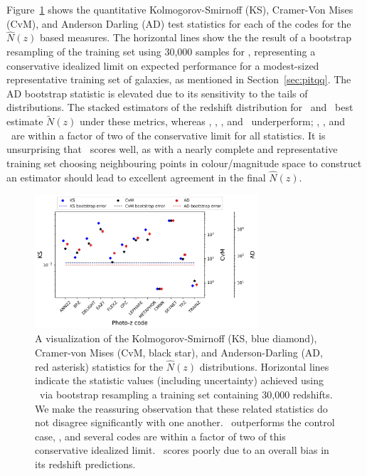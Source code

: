 Figure~\ref{fig:nz_stats} shows the quantitative Kolmogorov-Smirnoff (KS), Cramer-Von Mises (CvM), and Anderson Darling (AD) test statistics for each of the codes for the $\hat{N}(z)$ based measures.
The horizontal lines show the the result of a bootstrap resampling of the training set using 30,000 samples for \trainz, representing a conservative idealized limit on expected performance for a modest-sized representative training set of galaxies, as mentioned in Section~\ref{sec:pitqq}.
The AD bootstrap statistic is elevated due to its sensitivity to the tails of distributions.
The stacked estimators of the redshift distribution for \cmnn\ and \trainz\ best estimate $\tilde{N}(z)$ under these metrics, whereas \eazy, \lephare, \metaphor, and \skynet\ underperform; \bpz, \gpz, and \tpz\ are within a factor of two of the conservative limit for all statistics.
It is unsurprising that \cmnn\ scores well, as with a nearly complete and representative training set choosing neighbouring points in colour/magnitude space to construct an estimator should lead to excellent agreement in the final $\hat{N}(z)$.

\begin{figure}
\centering
\includegraphics[width=0.74\textwidth]{fig/KSvsCvMvsAD_NZ_withnull_jpg.jpg}
\caption{A visualization of the Kolmogorov-Smirnoff (KS, blue diamond), Cramer-von Mises (CvM, black star), and Anderson-Darling (AD, red asterisk) statistics for the $\hat{N}(z)$ distributions.
Horizontal lines indicate the statistic values (including uncertainty) achieved using \trainz\ via bootstrap resampling a training set containing 30,000 redshifts.
We make the reassuring observation that these related statistics do not disagree significantly with one another.
\cmnn\ outperforms the control case, \trainz, and several codes are within a factor of two of this conservative idealized limit.
\skynet\ scores poorly due to an overall bias in its redshift predictions.}
\label{fig:nz_stats}
\end{figure}

